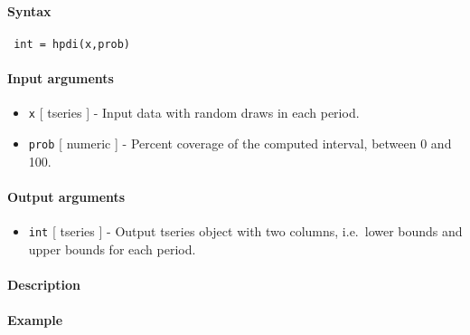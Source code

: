 


	\paragraph{Syntax}
 
 \begin{verbatim}
 int = hpdi(x,prob)
 \end{verbatim}
 
 \paragraph{Input arguments}
 
 \begin{itemize}
 \item
   \texttt{x} {[} tseries {]} - Input data with random draws in each
   period.
 \item
   \texttt{prob} {[} numeric {]} - Percent coverage of the computed
   interval, between 0 and 100.
 \end{itemize}
 
 \paragraph{Output arguments}
 
 \begin{itemize}
 \item
   \texttt{int} {[} tseries {]} - Output tseries object with two columns,
   i.e.~lower bounds and upper bounds for each period.
 \end{itemize}
 
 \paragraph{Description}
 
 \paragraph{Example}



